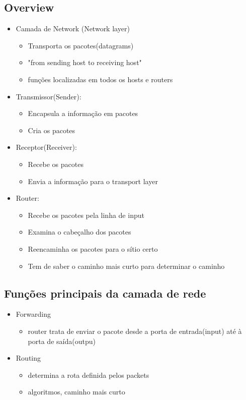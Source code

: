 \documentclass{article}
\begin{document}
\subsection{Overview}
\begin{itemize}
    \item Camada de Network (Network layer)
    \begin{itemize}
        \item Transporta os pacotes(datagrams)
        \item "from sending host to receiving host"
        \item funções localizadas em todos os hosts e routers
    \end{itemize}
    \item Transmissor(Sender):
    \begin{itemize}
        \item Encapsula a informação em pacotes
        \item Cria os pacotes
    \end{itemize}
    \item Receptor(Receiver):
    \begin{itemize}
        \item Recebe os pacotes
	    \item Envia a informação para o transport layer
    \end{itemize}
    \item Router:
    \begin{itemize}
        \item Recebe os pacotes pela linha de input
        \item Examina o cabeçalho dos pacotes
	    \item Reencaminha os pacotes para o sítio certo
	    \item Tem de saber o caminho mais curto para determinar o caminho
    \end{itemize}
\end{itemize}

\subsection{Funções principais da camada de rede}

\begin{itemize}
    \item Forwarding
    \begin{itemize}
        \item router trata de enviar o pacote desde a porta de entrada(input) até à porta de saída(outpu)
    \end{itemize}
    \item Routing
    \begin{itemize}
        \item determina a rota definida pelos packets
        \item algoritmos, caminho mais curto
    \end{itemize}
\end{itemize}
\end{document}
